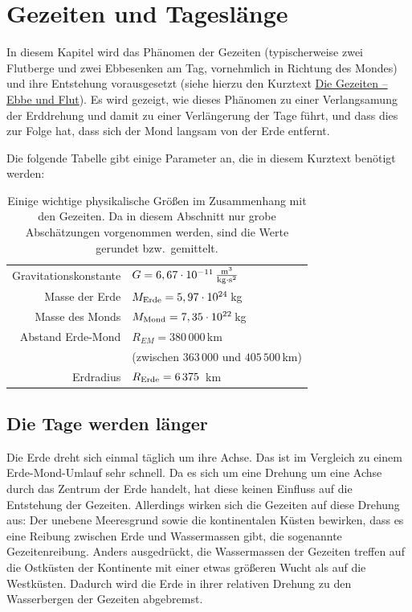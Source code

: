 
\chapter{Gezeiten und Tagesl\"ange}
\label{chap_Gezeiten2}
 
In diesem Kapitel wird das Ph\"anomen der Gezeiten (typischerweise zwei Flutberge
und zwei Ebbesenken am Tag, vornehmlich in Richtung des Mondes) und ihre
Entstehung vorausgesetzt (siehe hierzu den Kurztext \glqq\hyperref[chap_Gezeiten]{Die Gezeiten -- Ebbe und Flut}\grqq). 
Es wird gezeigt, wie dieses Ph\"anomen zu einer Verlangsamung
der Erddrehung und damit zu einer Verl\"angerung der Tage f\"uhrt, und dass dies
zur Folge hat, dass sich der Mond langsam von der Erde entfernt. 

Die folgende Tabelle gibt einige Parameter an, die in diesem Kurztext ben\"otigt werden: 
\begin{table}[htb]
\begin{tabular}{r|l}
Gravitationskonstante & $G= 6,67 \cdot 10^{-11}\,{\rm \frac{m^3}{kg\cdot s^2}}$  \\  
Masse der Erde & $M_{\rm Erde} = 5,97\cdot 10^{24}$\,kg  \\ 
Masse des Monds &  $ M_{\rm Mond} =7,35 \cdot 10^{22}$\,kg  \\
Abstand Erde-Mond &  $R_{EM} = 380\,000$\,km  \\[-0.2cm] 
 & (zwischen $363\,000$ und $405\,500$\,km) \\
Erdradius &   $R_{\rm Erde} =  6\,375$\, km \\
\end{tabular}
\caption{\label{tab_Tide2}%
Einige wichtige physikalische Gr\"o\ss en im Zusammenhang mit den Gezeiten.
Da in diesem Abschnitt nur grobe Absch\"atzungen vorgenommen werden, sind die 
Werte gerundet bzw.\ gemittelt.}
\end{table}
%

\section{Die Tage werden l\"anger}
\label{sec_EMWW}

Die Erde dreht sich einmal t\"aglich um ihre Achse. Das ist im Vergleich zu einem
Erde-Mond-Umlauf sehr schnell. Da es sich um eine Drehung um eine Achse durch
das Zentrum der Erde handelt, hat diese keinen Einfluss auf die Entstehung der Gezeiten. 
Allerdings wirken sich die Gezeiten auf diese Drehung aus: Der unebene Meeresgrund
sowie die kontinentalen K\"usten bewirken, dass es eine Reibung zwischen Erde und
Wassermassen gibt, die sogenannte Gezeitenreibung. 
Anders ausgedr\"uckt, die Wassermassen der Gezeiten treffen
auf die Ostk\"usten der Kontinente mit einer etwas gr\"o\ss eren Wucht als auf die
Westk\"usten. Dadurch wird die Erde in ihrer relativen Drehung zu den Wasserbergen
der Gezeiten abgebremst. 

